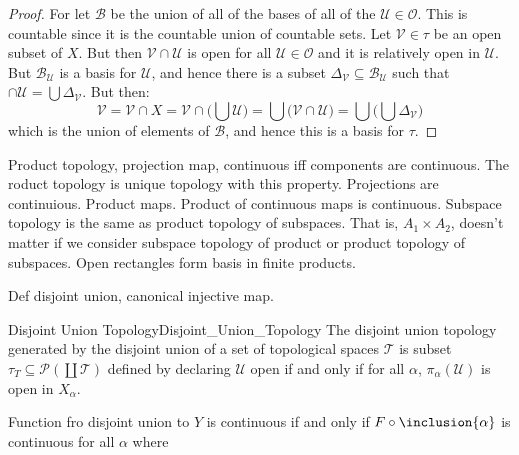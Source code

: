 \documentclass{article}                                                        %
\begin{document}
        \begin{proof}
            For let $\mathcal{B}$ be the union of all of the bases of all of the
            $\mathcal{U}\in\mathcal{O}$. This is countable since it is the
            countable union of countable sets. Let $\mathcal{V}\in\tau$ be an
            open subset of $X$. But then $\mathcal{V}\cap\mathcal{U}$ is open
            for all $\mathcal{U}\in\mathcal{O}$ and it is relatively open in
            $\mathcal{U}$. But $\mathcal{B}_{\mathcal{U}}$ is a basis for
            $\mathcal{U}$, and hence there is a subset
            $\Delta_{\mathcal{V}}\subseteq\mathcal{B}_{\mathcal{U}}$ such that
            $\cap\mathcal{U}=\bigcup\Delta_{\mathcal{V}}$. But then:
            \begin{equation}
                \mathcal{V}=\mathcal{V}\cap{X}=
                \mathcal{V}\cap\Big(\bigcup\mathcal{U}\Big)
                =\bigcup\big(\mathcal{V}\cap\mathcal{U}\big)
                =\bigcup\Big(\bigcup\Delta_{\mathcal{V}}\Big)
            \end{equation}
            which is the union of elements of $\mathcal{B}$, and hence this is a
            basis for $\tau$.
        \end{proof}
        Product topology, projection map, continuous iff components are
        continuous. The roduct topology is unique topology with this property.
        Projections are continuious. Product maps. Product of continuous maps
        is continuous. Subspace topology is the same as product topology of
        subspaces. That is, $A_{1}\times{A}_{2}$, doesn't matter if we consider
        subspace topology of product or product topology of subspaces.
        Open rectangles form basis in finite products.
        \par\hfill\par
        Def disjoint union, canonical injective map.
        \begin{fdefinition}{Disjoint Union Topology}{Disjoint_Union_Topology}
            The disjoint union topology generated by the disjoint union of a
            set of topological spaces $\mathscr{T}$ is subset
            $\tau_{T}\subseteq\mathcal{P}(\coprod\mathscr{T})$ defined by
            declaring $\mathcal{U}$ open if and only if for all $\alpha$,
            $\pi_{\alpha}(\mathcal{U})$ is open in $X_{\alpha}$.
        \end{fdefinition}
        Function fro disjoint union to $Y$ is continuous if and only if
        $F\circ\inclusion{\alpha}$ is continuous for all $\alpha$ where
\end{document}
